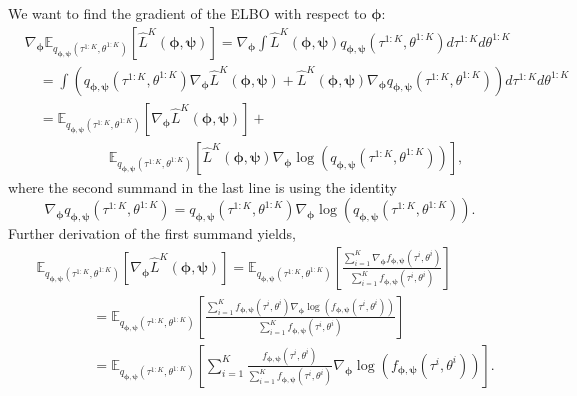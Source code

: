 \documentclass{article}
\newcommand{\E}{\mathbb{E}}
\begin{document}
We want to find the gradient of the ELBO with respect to $\bm{\phi}$:
\begin{align*}
    & \nabla_{\bm{\phi}} \E_{q_{\bm{\phi}, \bm{\psi}}(\tau^{1:K},\theta^{1:K})}[\hat{L}^K(\bm{\phi}, \bm{\psi})] = \nabla_{\bm{\phi}} \int \hat{L}^K(\bm{\phi}, \bm{\psi}) q_{\bm{\phi}, \bm{\psi}}(\tau^{1:K}, \theta^{1:K}) d\tau^{1:K} d\theta^{1:K} \\
    & \quad = \int \left( q_{\bm{\phi}, \bm{\psi}}(\tau^{1:K}, \theta^{1:K}) \nabla_{\bm{\phi}} \hat{L}^K(\bm{\phi}, \bm{\psi}) + \hat{L}^K(\bm{\phi}, \bm{\psi}) \nabla_{\bm{\phi}} q_{\bm{\phi}, \bm{\psi}}(\tau^{1:K}, \theta^{1:K}) \right) d\tau^{1:K} d\theta^{1:K} \\
    & \quad = \E_{q_{\bm{\phi}, \bm{\psi}}(\tau^{1:K}, \theta^{1:K})}[\nabla_{\bm{\phi}} \hat{L}^K(\bm{\phi}, \bm{\psi})] + \\
    & \qquad \qquad \qquad \E_{q_{\bm{\phi}, \bm{\psi}}(\tau^{1:K}, \theta^{1:K})}[\hat{L}^K(\bm{\phi}, \bm{\psi}) \nabla_{\bm{\phi}} \log(q_{\bm{\phi}, \bm{\psi}}(\tau^{1:K}, \theta^{1:K}))],
\end{align*}
where the second summand in the last line is using the identity
\[ \nabla_{\bm{\phi}} q_{\bm{\phi}, \bm{\psi}}(\tau^{1:K}, \theta^{1:K}) = q_{\bm{\phi}, \bm{\psi}}(\tau^{1:K}, \theta^{1:K}) \nabla_{\bm{\phi}} \log(q_{\bm{\phi}, \bm{\psi}}(\tau^{1:K}, \theta^{1:K})). \]
Further derivation of the first summand yields,
\begin{align}
    & \E_{q_{\bm{\phi}, \bm{\psi}}(\tau^{1:K}, \theta^{1:K})}[\nabla_{\bm{\phi}} \hat{L}^K(\bm{\phi}, \bm{\psi})] = \E_{q_{\bm{\phi}, \bm{\psi}}(\tau^{1:K}, \theta^{1:K})}\left[\frac{\sum_{i=1}^{K} \nabla_{\bm{\phi}} f_{\bm{\phi}, \bm{\psi}}(\tau^i, \theta^i)}{\sum\limits_{i=1}^{K} f_{\bm{\phi}, \bm{\psi}}(\tau^i, \theta^i)}\right] \nonumber \\
    & \qquad \qquad = \E_{q_{\bm{\phi}, \bm{\psi}}(\tau^{1:K}, \theta^{1:K})}\left[\frac{\sum_{i=1}^{K} f_{\bm{\phi}, \bm{\psi}}(\tau^i, \theta^i) \nabla_{\bm{\phi}} \log(f_{\bm{\phi}, \bm{\psi}}(\tau^i, \theta^i))}{\sum\limits_{i=1}^{K} f_{\bm{\phi}, \bm{\psi}}(\tau^i, \theta^i)}\right] \nonumber \\
    & \qquad \qquad = \E_{q_{\bm{\phi}, \bm{\psi}}(\tau^{1:K}, \theta^{1:K})}\left[\sum_{i=1}^{K} \frac{f_{\bm{\phi}, \bm{\psi}}(\tau^i, \theta^i) }{\sum\limits_{i=1}^{K} f_{\bm{\phi}, \bm{\psi}}(\tau^i, \theta^i)} \nabla_{\bm{\phi}} \log(f_{\bm{\phi}, \bm{\psi}}(\tau^i, \theta^i))\right]. \label{eq:presummand1}
\end{align}
\end{document}
